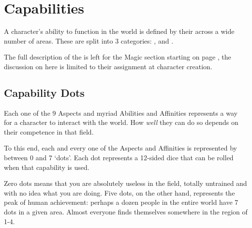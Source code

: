 
\newcommand\abilityRow[3]
{
	\index{Abilities!#3!#1}
	\index{#1|see{Abilities, #3 (#1)}}\imp{#1} & \parbox[t]{6.8 cm}{\raggedright #2} \\
}

\newcommand\abilityTable[1]
{
	{
	\small
	\begin{center}
		\begin{rndtable}{r l}
		\bf Ability	& \bf Description \\
		#1
		\end{rndtable}
	\end{center}
	}
}
\def\cc{\cellcolor{\tablecolorhead}\bf}
\newcommand\fourRow[4]{{\cc \bf \key{#1}}	&	\imp{#2}	&	\imp{#3}	&	\imp{#4} \\}



\chapter{Capabilities}\label{C:Aspects}

A character's ability to function in the world is defined by their  across a wide number of areas. These  are split into 3 categories: ,  and . 

The full description of the  is left for the Magic section starting on page \pageref{C:Magic}, the discussion on  here is limited to their assignment at character creation. 

\section{Capability Dots}

Each one of the 9 Aspects and myriad Abilities and Affinities represents a way for a character to interact with the world. How {\it well} they can do so depends on their competence in that field. 

To this end, each and every one of the Aspects and Affinities is represented by between 0 and 7 `dots'. Each dot represents a 12-sided dice that can be rolled when that capability is used. 

Zero dots means that you are absolutely useless in the field, totally untrained and with no idea what you are doing. Five dots, on the other hand, represents the peak of human achievement: perhaps a dozen people in the entire world have 7 dots in a given area. Almost everyone finds themselves somewhere in the region of 1-4. 

